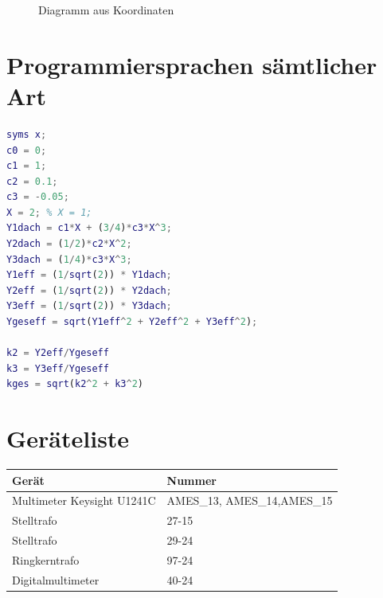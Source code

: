 \documentclass[
12pt,
a4paper,
headings=small,                    %
bibliography=totoc,                %
listof=totoc,                      %
parskip=half*,                     %
]{scrartcl}                        %
\begin{document}
\resetlaborsectioncounter
{}
\begin{figure}[H]
    \centering
    \caption{Diagramm aus Koordinaten}
    \label{fig:2_2_diagramm}
\end{figure}


\newpage
\section{Programmiersprachen sämtlicher Art}
\begin{lstlisting}[language=matlab]
syms x;
c0 = 0;
c1 = 1;
c2 = 0.1;
c3 = -0.05;
X = 2; % X = 1;
Y1dach = c1*X + (3/4)*c3*X^3;
Y2dach = (1/2)*c2*X^2;
Y3dach = (1/4)*c3*X^3;
Y1eff = (1/sqrt(2)) * Y1dach;
Y2eff = (1/sqrt(2)) * Y2dach;
Y3eff = (1/sqrt(2)) * Y3dach;
Ygeseff = sqrt(Y1eff^2 + Y2eff^2 + Y3eff^2);

k2 = Y2eff/Ygeseff
k3 = Y3eff/Ygeseff
kges = sqrt(k2^2 + k3^2)

\end{lstlisting}



\newpage
\printbibliography




\newpage
\section*{Geräteliste}
\begin{table} [H]
    \begin{tabular}{|l|l|}
        \hline
        \textbf{Gerät }            & \textbf{Nummer }            \\ \hline
        Multimeter Keysight U1241C & AMES\_13, AMES\_14,AMES\_15 \\ \hline
        Stelltrafo                 & 27-15                       \\ \hline
        Stelltrafo                 & 29-24                       \\ \hline
        Ringkerntrafo              & 97-24                       \\ \hline
        Digitalmultimeter          & 40-24                       \\ \hline
    \end{tabular}
\end{table}
\end{document}
